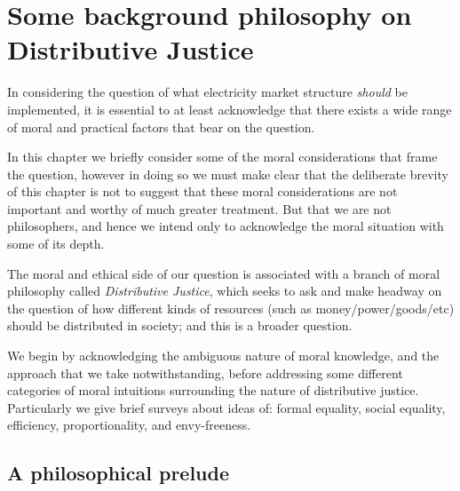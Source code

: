 \chapter{Some background philosophy on Distributive Justice}
\label{cha:background}\label{sec:philosophy}


In considering the question of what electricity market structure \textit{should} be implemented, it is essential to at least acknowledge that there exists a wide range of moral and practical factors that bear on the question.

In this chapter we briefly consider some of the moral considerations that frame the question, however in doing so we must make clear that the deliberate brevity of this chapter is not to suggest that these moral considerations are not important and worthy of much greater treatment. But that we are not philosophers, and hence we intend only to acknowledge the moral situation with some of its depth.


The moral and ethical side of our question is associated with a branch of moral philosophy called \textit{Distributive Justice}, which seeks to ask and make headway on the question of how different kinds of resources (such as money/power/goods/etc) should be distributed in society; and this is a broader question.

We begin by acknowledging the ambiguous nature of moral knowledge, and the approach that we take notwithstanding, before addressing some different categories of moral intuitions surrounding the nature of distributive justice.
Particularly we give brief surveys about ideas of: formal equality, social equality, efficiency, proportionality, and envy-freeness.

\section{A philosophical prelude}

